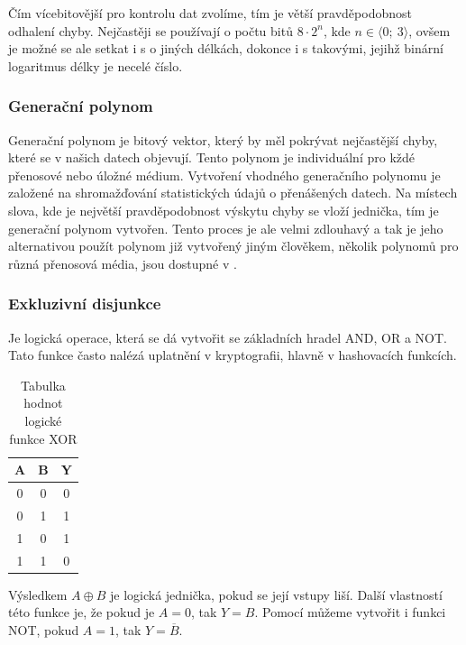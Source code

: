 Čím vícebitovější  pro kontrolu dat zvolíme, tím je větší pravděpodobnost odhalení chyby. Nejčastěji se používají  o počtu bitů $8 \cdot 2^n$, kde $n \in \langle 0;~3\rangle$, ovšem je možné se ale setkat i s  o jiných délkách, dokonce i s takovými, jejihž binární logaritmus délky je necelé číslo.

\subsubsection{Generační polynom}
Generační polynom je bitový vektor, který by měl pokrývat nejčastější chyby, které se v našich datech objevují. Tento polynom je individuální pro kždé přenosové nebo úložné médium. Vytvoření vhodného generačního polynomu je založené na shromažďování statistických údajů o přenášených datech. Na místech slova, kde je největší pravděpodobnost výskytu chyby se vloží jednička, tím je generační polynom vytvořen. Tento proces je ale velmi zdlouhavý a tak je jeho alternativou použít polynom již vytvořený jiným člověkem, několik polynomů pro různá přenosová média, jsou dostupné v \cite{crc-wiki}.

\subsubsection{Exkluzivní disjunkce}
Je logická operace, která se dá vytvořit se základních hradel AND, OR a NOT. Tato funkce často nalézá uplatnění v kryptografii, hlavně v hashovacích funkcích.

\begin{table}[!h]
  \caption{Tabulka hodnot logické funkce XOR}
  \begin{center}
  	\small
	  \begin{tabular}{|c|c||c|}
	    \hline
	    A & B & Y \\
	    \hline\hline
	    0 & 0 & 0 \\
	    \hline
	    0 & 1 & 1 \\
	    \hline
	    1 & 0 & 1 \\
	    \hline
	    1 & 1 & 0 \\
	    \hline
	  \end{tabular}
  \end{center}
\end{table}

 Výsledkem  $A \oplus B $ je logická jednička, pokud se její vstupy liší. Další vlastností této funkce je, že pokud je $A = 0$, tak $Y = B$. Pomocí  můžeme vytvořit i funkci NOT, pokud $A = 1$, tak $Y = \overline{B}$.

